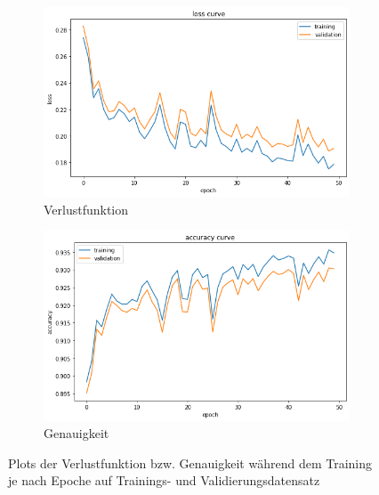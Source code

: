 \begin{figure}
    \centering
    \begin{subfigure}{0.45\textwidth}
        \centering
        \includegraphics[width=\textwidth]{images/loss_curve.png}
        \caption{Verlustfunktion}
        \label{fig:loss_curve}
    \end{subfigure}
    \begin{subfigure}{0.45\textwidth}
        \centering
        \includegraphics[width=\textwidth]{images/acc_curve.png}
        \caption{Genauigkeit}
        \label{fig:acc_curve}
    \end{subfigure}
    \caption{Plots der Verlustfunktion bzw. Genauigkeit während dem Training je nach Epoche auf Trainings- und Validierungsdatensatz}
    \label{fig:train_hist}
\end{figure}

